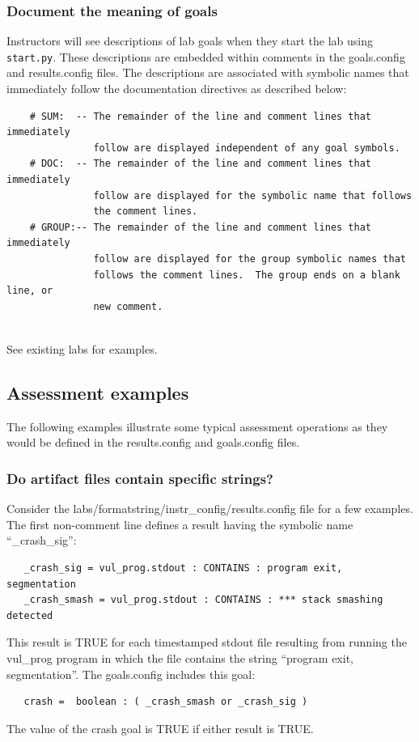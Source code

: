 \documentclass[12pt]{article}
\begin{document}
\subsubsection{Document the meaning of goals}
\label{document goals}
Instructors will see descriptions of lab goals when they start the lab using {\tt start.py}.
These descriptions are embedded within comments in the goals.config and results.config files.
The descriptions are associated with symbolic names that immediately follow the documentation
directives as described below:
\begin{verbatim}
    # SUM:  -- The remainder of the line and comment lines that immediately
               follow are displayed independent of any goal symbols.
    # DOC:  -- The remainder of the line and comment lines that immediately 
               follow are displayed for the symbolic name that follows
               the comment lines.
    # GROUP:-- The remainder of the line and comment lines that immediately 
               follow are displayed for the group symbolic names that 
               follows the comment lines.  The group ends on a blank line, or 
               new comment.
   
\end{verbatim} 
\noindent See existing labs for examples.


\subsection{Assessment examples}
\label{examples}
The following examples illustrate some typical assessment operations as they would
be defined in the results.config and goals.config files.

\subsubsection{Do artifact files contain specific strings?}
Consider the labs/formatstring/instr\_config/results.config file for a few examples.  
The first non-comment line defines a result having the symbolic name ``\_crash\_sig'':
\begin{verbatim}
   _crash_sig = vul_prog.stdout : CONTAINS : program exit, segmentation
   _crash_smash = vul_prog.stdout : CONTAINS : *** stack smashing detected
\end{verbatim}
\noindent This result is TRUE for each timestamped stdout file resulting from running 
the vul\_prog program in which the file contains the string ``program exit, segmentation''.
The goals.config includes this goal:
\begin{verbatim}
   crash =  boolean : ( _crash_smash or _crash_sig )
\end{verbatim}
\noindent The value of the crash goal is TRUE if either result is TRUE.
\end{document}
